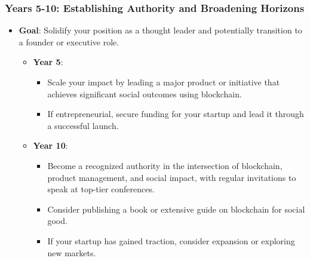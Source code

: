 \hypertarget{year-4-5-establishing-authority-and-broadening-horizons}{%
\subsubsection*{\texorpdfstring{\textbf{Years 5-10: Establishing Authority
and Broadening
Horizons}}{Years 5-10: Establishing Authority and Broadening Horizons}}\label{year-4-5-establishing-authority-and-broadening-horizons}}

\begin{itemize}
\tightlist
\item
  \textbf{Goal}: Solidify your position as a thought leader and
  potentially transition to a founder or executive role.

  \begin{itemize}
  \tightlist
  \item
    \textbf{Year 5}:

    \begin{itemize}
    \tightlist
    \item
      Scale your impact by leading a major product or initiative that
      achieves significant social outcomes using blockchain.
    \item
      If entrepreneurial, secure funding for your startup and lead it
      through a successful launch.
    \end{itemize}
  \item
    \textbf{Year 10}:

    \begin{itemize}
    \tightlist
    \item
      Become a recognized authority in the intersection of blockchain,
      product management, and social impact, with regular invitations to
      speak at top-tier conferences.
    \item
      Consider publishing a book or extensive guide on blockchain for
      social good.
    \item
      If your startup has gained traction, consider expansion or
      exploring new markets.
    \end{itemize}
  \end{itemize}
\end{itemize}


